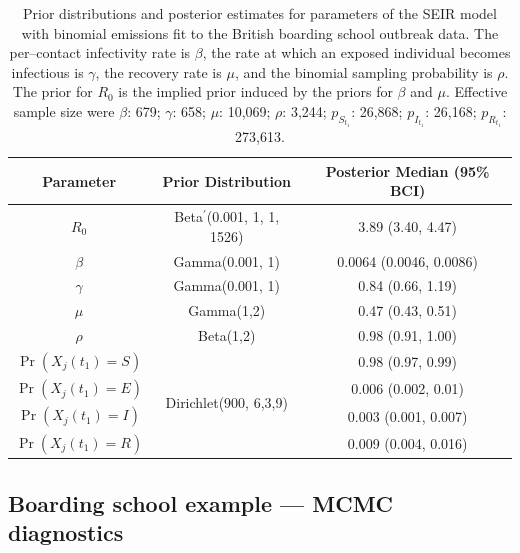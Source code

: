 \begin{table}[htbp]
	\begin{center}
		\begin{tabular}{ccc}
			\hline Parameter &  Prior Distribution & Posterior Median (95\% BCI)  \\ 
			\hline
			\hline $R_0$ & Beta$ ^\prime $(0.001, 1, 1, 1526) & 3.89 (3.40, 4.47) \\
			\hline $\beta$ & Gamma(0.001, 1) & 0.0064 (0.0046, 0.0086) \\ 
			\hline $ \gamma $ & Gamma(0.001, 1) & 0.84 (0.66, 1.19) \\
			\hline $\mu$ & Gamma(1,2) & 0.47 (0.43, 0.51) \\ 
			\hline $\rho $ & Beta(1,2) & 0.98 (0.91, 1.00)\\
			\hline $\Pr(X_j(t_1) = S)$& \multirow{4}{*}{Dirichlet(900, 6,3,9)} & 0.98 (0.97, 0.99) \\
			\hline $ \Pr(X_j(t_1) = E) $ & & 0.006 (0.002, 0.01)\\
			$\Pr(X_j(t_1) = I)$& & 0.003 (0.001, 0.007) \\
			$\Pr(X_j(t_1) = R)$&  & 0.009 (0.004, 0.016)\\
			\hline 
		\end{tabular}
		\caption[Prior distributions for an SEIR model fit to the British boarding school outbreak data.]{Prior distributions and posterior estimates for parameters of the SEIR model with binomial emissions fit to the British boarding school outbreak data. The per--contact infectivity rate is $ \beta $, the rate at which an exposed individual becomes infectious is $ \gamma $, the recovery rate is $ \mu $, and the binomial sampling probability is $ \rho $. The prior for $ R_0 $ is the implied prior induced by the priors for $ \beta $ and $ \mu $. Effective sample size were $\beta$: 679; $\gamma$: 658; $\mu$: 10,069; $ \rho $: 3,244; $p_{S_{t_1}}$: 26,868; $p_{I_{t_1}}$: 26,168; $p_{R_{t_1}}$: 273,613.}
		\label{tab:bbs_SEIR_prior_binom}
	\end{center}
\end{table}

\subsection{Boarding school example --- MCMC diagnostics}

